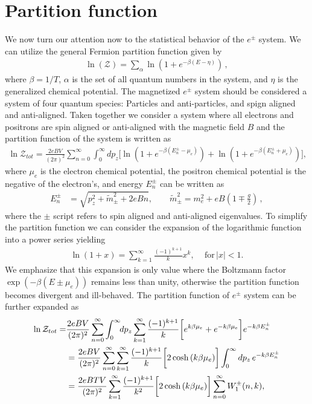 \documentclass[Universe,article,submit,moreauthors,pdftex]{Definitions/mdpi}
\begin{document}
\section{Partition function}
\noindent We now turn our attention now to the statistical behavior of the $e^{\pm}$ system. We can utilize the general Fermion partition function given by
\begin{align}
  \label{PartFunc} \ln(\mathcal{Z})=\sum_{\alpha}\ln\left(1+e^{-\beta(E-\eta)}\right)\,,
\end{align}
where $\beta=1/T$, $\alpha$ is the set of all quantum numbers in the system, and $\eta$ is the generalized chemical potential. The magnetized $e^{\pm}$ system should be considered a system of four quantum species: Particles and anti-particles, and spign aligned and anti-aligned. Taken together we consider a system where all electrons and positrons are spin aligned or anti-aligned with the magnetic field $B$ and the partition function of the system is written as
\begin{align}
\ln\mathcal{Z}_{tot}=\frac{2eBV}{(2\pi)^2}\sum_{n=0}^\infty\int^\infty_{0} \!\!dp_z\bigg[\ln\left(1+e^{-\beta(E_{n}^\pm-\mu_e)}\right)+\ln\left(1+e^{-\beta(E_{n}^\pm+\mu_e)}\right)\bigg],
\end{align}
where $\mu_e$ is the electron chemical potential, the positron chemical potential is the negative of the electron's, and energy $E_{n}^\pm$ can be written as
\begin{align}
E_{n}^\pm&=\sqrt{p^2_z+\tilde m^2_\pm+2eBn},\qquad\tilde{m}^2_\pm=m^2_e+eB\left(1\mp\frac{g}{2}\right)\,,
\end{align}
where the $\pm$ script refers to spin aligned and anti-aligned eigenvalues. To simplify the partition function we can consider the expansion of the logarithmic function into a power series yielding
\begin{align}
\ln\left(1+x\right)=\sum^{\infty}_{k=1}\frac{(-1)^{k+1}}{k}x^k, \,\,\,\,\,\,\,\mathrm{for}\,|x|<1.
\end{align}
We emphasize that this expansion is only value where the Boltzmann factor $\exp\left(-\beta(E\pm\mu_{e})\right)$ remains less than unity, otherwise the partition function becomes divergent and ill-behaved. The partition function of $e^{\pm}$ system can be further expanded as
\begin{align}
\ln\mathcal{Z}_{tot}=&\frac{2eBV}{(2\pi)^2}\sum_{n=0}^\infty\int^\infty_{0} \!\!dp_z\sum^{\infty}_{k=1}\frac{(-1)^{k+1}}{k}\bigg[e^{k\beta\mu_e}+e^{-k\beta\mu_e}\bigg]e^{-k\beta E_n^\pm}\notag\\
&=\frac{2eBV}{(2\pi)^2}\sum_{n=0}^\infty\sum^{\infty}_{k=1}\frac{(-1)^{k+1}}{k}\bigg[2\cosh{(k\beta\mu_e)}\bigg]\int_0^\infty dp_z\,e^{-k\beta E_n^\pm}\notag\\
&=\frac{2eBTV}{(2\pi)^2}\sum^{\infty}_{k=1}\frac{(-1)^{k+1}}{k^2}\bigg[2\cosh{(k\beta\mu_e)}\bigg]\sum_{n=0}^\infty W^\pm_1(n,k),
\end{align}
\end{document}
